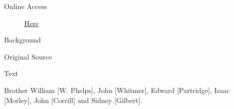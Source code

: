 			\begin{description}
				\item[Online Access] \href{https://www.josephsmithpapers.org/paper-summary/letter-to-church-leaders-in-jackson-county-missouri-18-august-1833/1}{Here}
			\end{description}
			
			\begin{description}
				\item[Background]
			\end{description}
			
			
			\begin{description}
				\item[Original Source]
			\end{description}
			
			
			\begin{description}
				\item[Text]
			\end{description}
			
				
				Brother William [W. Phelps], John [Whitmer], Edward [Partridge], Isaac [Morley], John [Corrill] and Sidney [Gilbert].
				
